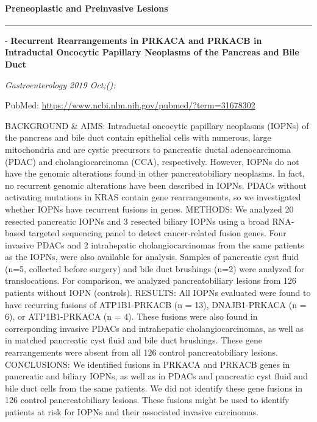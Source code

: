 \documentclass[
]{article}
\renewcommand{\linethickness}{0.05em}
\begin{document}
\pagebreak

\hypertarget{pancreas_preinvasive_molecular}{%
\paragraph{Preneoplastic and Preinvasive
Lesions}\label{pancreas_preinvasive_molecular}}

\begin{center}\rule{0.5\linewidth}{\linethickness}\end{center}

- \textbf{Recurrent Rearrangements in PRKACA and PRKACB in Intraductal
Oncocytic Papillary Neoplasms of the Pancreas and Bile Duct}

\emph{Gastroenterology 2019 Oct;():}

PubMed: \url{https://www.ncbi.nlm.nih.gov/pubmed/?term=31678302}

BACKGROUND \& AIMS: Intraductal oncocytic papillary neoplasms (IOPNs) of
the pancreas and bile duct contain epithelial cells with numerous, large
mitochondria and are cystic precursors to pancreatic ductal
adenocarcinoma (PDAC) and cholangiocarcinoma (CCA), respectively.
However, IOPNs do not have the genomic alterations found in other
pancreatobiliary neoplasms. In fact, no recurrent genomic alterations
have been described in IOPNs. PDACs without activating mutations in KRAS
contain gene rearrangements, so we investigated whether IOPNs have
recurrent fusions in genes. METHODS: We analyzed 20 resected pancreatic
IOPNs and 3 resected biliary IOPNs using a broad RNA-based targeted
sequencing panel to detect cancer-related fusion genes. Four invasive
PDACs and 2 intrahepatic cholangiocarcinomas from the same patients as
the IOPNs, were also available for analysis. Samples of pancreatic cyst
fluid (n=5, collected before surgery) and bile duct brushings (n=2) were
analyzed for translocations. For comparison, we analyzed
pancreatobiliary lesions from 126 patients without IOPN (controls).
RESULTS: All IOPNs evaluated were found to have recurring fusions of
ATP1B1-PRKACB (n = 13), DNAJB1-PRKACA (n = 6), or ATP1B1-PRKACA (n = 4).
These fusions were also found in corresponding invasive PDACs and
intrahepatic cholangiocarcinomas, as well as in matched pancreatic cyst
fluid and bile duct brushings. These gene rearrangements were absent
from all 126 control pancreatobiliary lesions. CONCLUSIONS: We
identified fusions in PRKACA and PRKACB genes in pancreatic and biliary
IOPNs, as well as in PDACs and pancreatic cyst fluid and bile duct cells
from the same patients. We did not identify these gene fusions in 126
control pancreatobiliary lesions. These fusions might be used to
identify patients at risk for IOPNs and their associated invasive
carcinomas.
\end{document}
